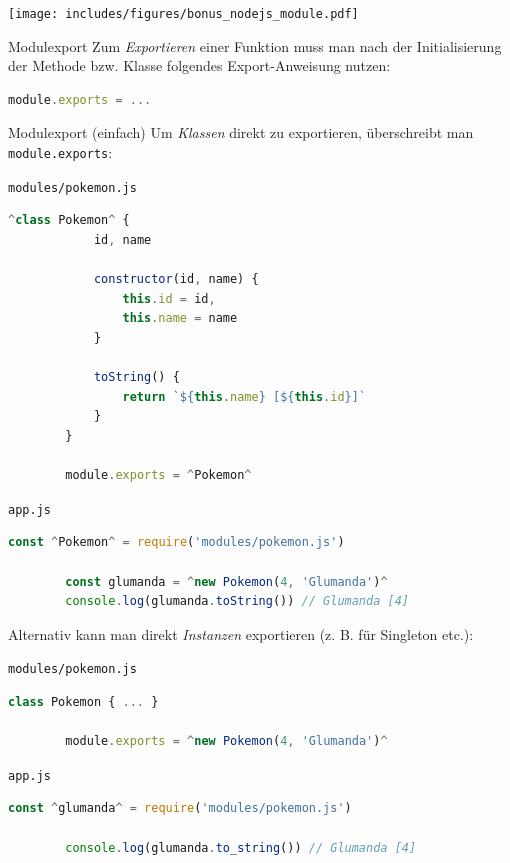 \begin{center}
    \texttt{[image: includes/figures/bonus\_nodejs\_module.pdf]}
\end{center}

\begin{defi}{Modulexport}
    Zum \emph{Exportieren} einer Funktion muss man nach der Initialisierung der Methode bzw. Klasse folgendes Export-Anweisung nutzen:
    \begin{lstlisting}[language=JavaScript]
        module.exports = ...
    \end{lstlisting}
\end{defi}

\begin{example}{Modulexport (einfach)}
    Um \emph{Klassen} direkt zu exportieren, überschreibt man \texttt{module.exports}:

    \texttt{modules/pokemon.js}
    \begin{lstlisting}[language=JavaScript]
        ^class Pokemon^ {
            id, name

            constructor(id, name) {
                this.id = id,
                this.name = name
            }

            toString() {
                return `${this.name} [${this.id}]`
            }
        }

        module.exports = ^Pokemon^
    \end{lstlisting}

    \texttt{app.js}
    \begin{lstlisting}[language=JavaScript]
        const ^Pokemon^ = require('modules/pokemon.js')

        const glumanda = ^new Pokemon(4, 'Glumanda')^
        console.log(glumanda.toString()) // Glumanda [4]
    \end{lstlisting}

    Alternativ kann man direkt \emph{Instanzen} exportieren (z. B. für Singleton etc.):

    \texttt{modules/pokemon.js}
    \begin{lstlisting}[language=JavaScript]
        class Pokemon { ... }

        module.exports = ^new Pokemon(4, 'Glumanda')^
    \end{lstlisting}

    \texttt{app.js}
    \begin{lstlisting}[language=JavaScript]
        const ^glumanda^ = require('modules/pokemon.js')

        console.log(glumanda.to_string()) // Glumanda [4]
    \end{lstlisting}
\end{example}

